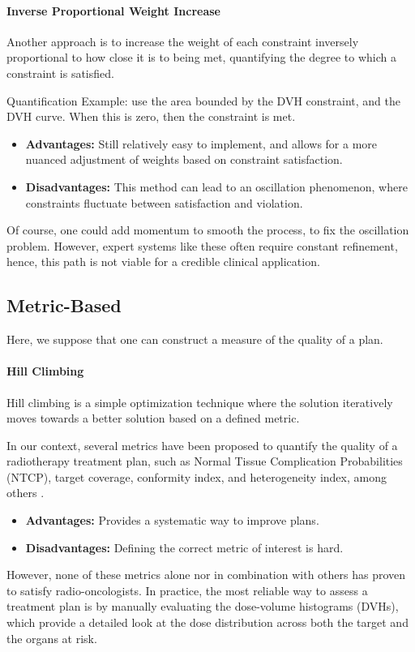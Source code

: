 \paragraph{Inverse Proportional Weight Increase}
Another approach is to increase the weight of each constraint inversely proportional to how close it is to being met, quantifying the degree to which a constraint is satisfied.

Quantification Example: use the area bounded by the DVH constraint, and the DVH curve.
When this is zero, then the constraint is met.
\begin{itemize}
	\item \textbf{Advantages:} Still relatively easy to implement, and allows for a more nuanced adjustment of weights based on constraint satisfaction.
	\item \textbf{Disadvantages:} This method can lead to an oscillation phenomenon, where constraints fluctuate between satisfaction and violation.
\end{itemize}
Of course, 	one could add momentum to smooth the process, to fix the oscillation problem.
However, expert systems like these often require constant refinement, hence, this path is not viable for a credible clinical application.

\subsection{Metric-Based}
Here, we suppose that one can construct a measure of the quality of a plan.

\paragraph{Hill Climbing}
Hill climbing is a simple optimization technique where the solution iteratively moves towards a better solution based on a defined metric.

In our context, several metrics have been proposed to quantify the quality of a radiotherapy treatment plan, such as Normal Tissue Complication Probabilities (NTCP), target coverage, conformity index, and heterogeneity index, among others \cite{lyman_normal_1992,li_input_2022}\label{metrics}.
\begin{itemize}
	\item \textbf{Advantages:} Provides a systematic way to improve plans.
	\item \textbf{Disadvantages:} Defining the correct metric of interest is hard.
\end{itemize}
However, none of these metrics alone nor in combination with others has proven to satisfy radio-oncologists.
In practice, the most reliable way to assess a treatment plan is by manually evaluating the dose-volume histograms (DVHs), which provide a detailed look at the dose distribution across both the target and the organs at risk.

